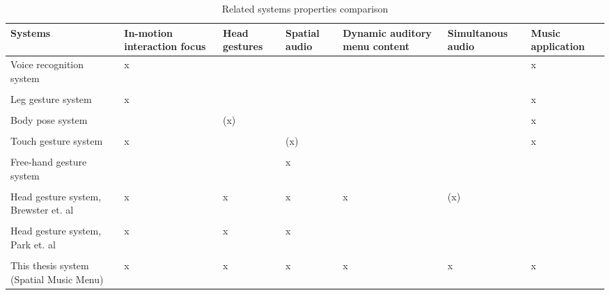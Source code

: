 \begin{table}[t] 
\scriptsize
\caption{Related systems properties comparison} %
\begin{tabular}{L{2.5cm}C{1.5cm}C{1.5cm}C{1.5cm}C{1.5cm}C{1.8cm}C{1.5cm}} \toprule
	Systems & In-motion interaction focus & Head gestures & Spatial audio & Dynamic auditory menu content & Simultanous audio & Music application \\ \midrule
    Voice recognition system \cite{stewart_boling_voice_2013}   & x &  &  &  &  & x \\
    \\
	Leg gesture system \cite{smus_running_2010}   & x &  &  &  &  & x \\ %
	\\
	Body pose system \cite{strachan_bodyspace_2007}   &  & (x) &  &  &  & x \\
	\\
	Touch gesture system \cite{pirhonen_gestural_2002}   & x &  & (x) &  &  & x \\
	\\
	Free-hand gesture system \cite{kajastila_interaction_2013}   &  &  & x &  &  &  \\
	\\
	Head gesture system, Brewster et. al \cite{brewster_multimodaleyes-freeinteraction_2003}   & x & x & x & x & (x) &   \\
	\\
	Head gesture system, Park et. al \cite{park_gaze-directed_2011}   & x & x & x &  &  &  \\
	\\
	This thesis system (Spatial Music Menu)   & x & x & x & x & x & x \\ \bottomrule
\end{tabular}

\label{tab:related} 
\end{table}








